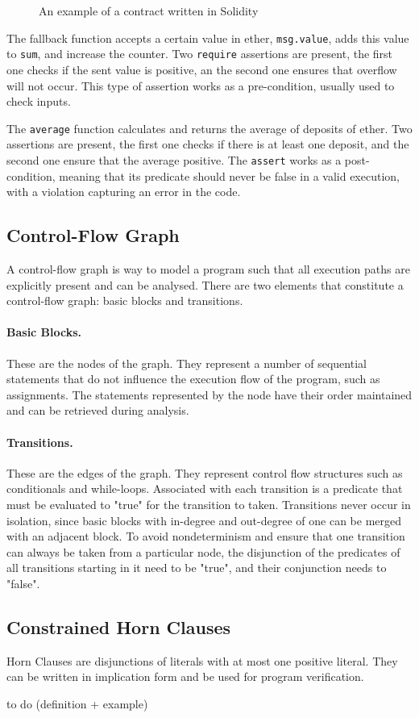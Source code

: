\begin{figure}

\caption{An example of a contract written in Solidity}
\label{fig:contractC}
\end{figure}

The fallback function accepts a certain value in ether, \texttt{msg.value}, adds this value to \texttt{sum}, and increase the counter. Two \texttt{require} assertions are present, the first one checks if the sent value is positive, an the second one ensures that overflow will not occur. This type of assertion works as a pre-condition, usually used to check inputs.

The \texttt{average} function calculates and returns the average of deposits of ether. Two assertions are present, the first one checks if there is at least one deposit, and the second one ensure that the average positive. The \texttt{assert} works as a post-condition, meaning that its predicate should never be false in a valid execution, with a violation capturing an error in the code.


\subsection{Control-Flow Graph} \label{sec:cfg}

A control-flow graph is way to model a program such that all execution paths are explicitly present and can be analysed. There are two elements that constitute a control-flow graph: basic blocks and transitions.

\paragraph{Basic Blocks.} These are the nodes of the graph. They represent a number of sequential statements that do not influence the execution flow of the program, such as assignments. The statements represented by the node have their order maintained and can be retrieved during analysis.

\paragraph{Transitions.} These are the edges of the graph. They represent control flow structures such as conditionals and while-loops. Associated with each transition is a predicate that must be evaluated to "true" for the transition to taken. Transitions never occur in isolation, since basic blocks with in-degree and out-degree of one can be merged with an adjacent block. To avoid nondeterminism and ensure that one transition can always be taken from a particular node, the disjunction of the predicates of all transitions starting in it need to be "true", and their conjunction needs to "false".


\subsection{Constrained Horn Clauses} \label{sec:chc}

Horn Clauses are disjunctions of literals with at most one positive literal. They can be written in implication form and be used for program verification.

to do (definition + example)